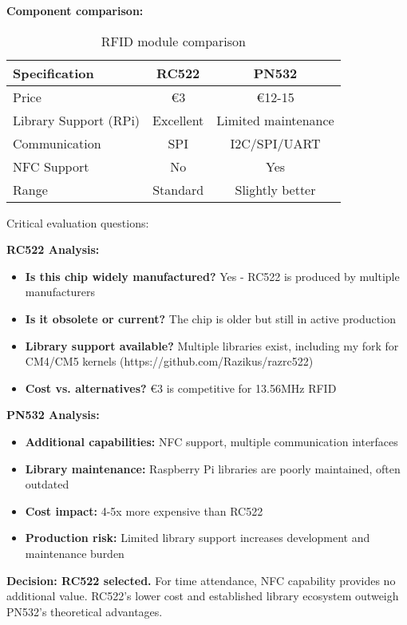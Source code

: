 \textbf{Component comparison:}

\begin{table}[h]
\centering
\begin{tabular}{|l|c|c|}
\hline
\textbf{Specification} & \textbf{RC522} & \textbf{PN532} \\
\hline
Price & €3 & €12-15 \\
Library Support (RPi) & Excellent & Limited maintenance \\
Communication & SPI & I2C/SPI/UART \\
NFC Support & No & Yes \\
Range & Standard & Slightly better \\
\hline
\end{tabular}
\caption{RFID module comparison}
\end{table}

Critical evaluation questions:

\textbf{RC522 Analysis:}
\begin{itemize}
\item \textbf{Is this chip widely manufactured?} Yes - RC522 is produced by multiple manufacturers
\item \textbf{Is it obsolete or current?} The chip is older but still in active production
\item \textbf{Library support available?} Multiple libraries exist, including my fork for CM4/CM5 kernels (https://github.com/Razikus/razrc522)
\item \textbf{Cost vs. alternatives?} €3 is competitive for 13.56MHz RFID
\end{itemize}

\textbf{PN532 Analysis:}
\begin{itemize}
\item \textbf{Additional capabilities:} NFC support, multiple communication interfaces
\item \textbf{Library maintenance:} Raspberry Pi libraries are poorly maintained, often outdated
\item \textbf{Cost impact:} 4-5x more expensive than RC522
\item \textbf{Production risk:} Limited library support increases development and maintenance burden
\end{itemize}

\textbf{Decision: RC522 selected.} For time attendance, NFC capability provides no additional value. RC522's lower cost and established library ecosystem outweigh PN532's theoretical advantages.

